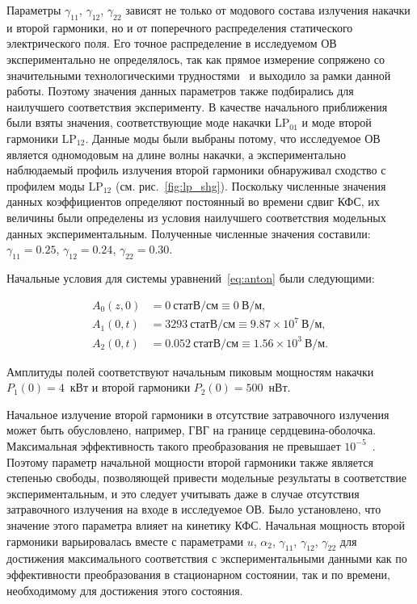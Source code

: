 Параметры $\gamma_{11}$, $\gamma_{12}$, $\gamma_{22}$ зависят не только от модового состава излучения накачки и второй гармоники, но и от поперечного распределения статического электрического поля. Его точное распределение в исследуемом ОВ экспериментально не определялось, так как прямое измерение сопряжено со значительными технологическими трудностями~\cite{dominic1994high} и выходило за рамки данной работы. Поэтому значения данных параметров также подбирались для наилучшего соответствия эксперименту. В качестве начального приближения были взяты значения, соответствующие моде накачки LP$_{01}$ и моде второй гармоники LP$_{12}$. Данные моды были выбраны потому, что исследуемое ОВ является одномодовым на длине волны накачки, а экспериментально наблюдаемый профиль излучения второй гармоники обнаруживал сходство с профилем моды LP$_{12}$ (см. рис.~\cref{fig:lp_shg}). Поскольку численные значения данных коэффициентов определяют постоянный во времени сдвиг КФС, их величины были определены из условия наилучшего соответствия модельных данных экспериментальным. Полученные численные значения составили: $\gamma_{11} = 0.25$, $\gamma_{12} = 0.24$, $\gamma_{22} = 0.30$.

Начальные условия для системы уравнений~\eqref{eq:anton} были следующими:

\begin{equation}
	\begin{split}
		A_{0}(z, 0) &= 0~\text{статВ/см} \equiv 0~\text{В/м}, \\
		A_{1}(0, t) &= 3293~\text{статВ/см} \equiv 9.87 \times 10^{7}~\text{В/м}, \\
		A_{2}(0, t) &= 0.052~\text{статВ/см} \equiv 1.56 \times 10^{3}~\text{В/м}.
	\end{split}
\end{equation}


Амплитуды полей соответствуют начальным пиковым мощностям накачки $P_1(0) = 4$~кВт и второй гармоники $P_2(0) = 500$~нВт.

Начальное излучение второй гармоники в отсутствие затравочного излучения может быть обусловлено, например, ГВГ на границе сердцевина-оболочка. Максимальная эффективность такого преобразования не превышает $10^{-5}$~\cite{terhune1987second}. Поэтому параметр начальной мощности второй гармоники также является степенью свободы, позволяющей привести модельные результаты в соответствие экспериментальным, и это следует учитывать даже в случае отсутствия затравочного излучения на входе в исследуемое ОВ. Было установлено, что значение этого параметра влияет на кинетику КФС. Начальная мощность второй гармоники варьировалась вместе с параметрами $u$, $\alpha_2$, $\gamma_{11}$, $\gamma_{12}$, $\gamma_{22}$ для достижения максимального соответствия с экспериментальными данными как по эффективности преобразования в стационарном состоянии, так и по времени, необходимому для достижения этого состояния.

